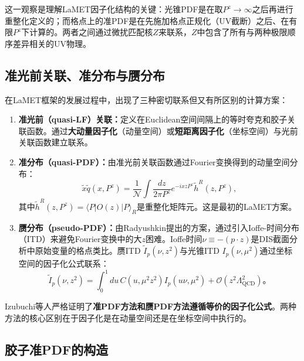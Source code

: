 \documentclass[12pt,a4paper]{ctexart}
\theoremstyle{definition}
\begin{document}
这一观察是理解LaMET因子化结构的关键：光锥PDF是在取$P^z \to \infty$之后再进行重整化定义的；而格点上的准PDF是在先施加格点正规化（UV截断）之后、在有限$P^z$下计算的。两者之间通过微扰匹配核$Z$来联系，$Z$中包含了所有与两种极限顺序差异相关的UV物理。

\subsection{准光前关联、准分布与赝分布}

在LaMET框架的发展过程中，出现了三种密切联系但又有所区别的计算方案\cite{Yao2023}：

\begin{enumerate}
    \item \textbf{准光前（quasi-LF）关联：}定义在Euclidean空间间隔上的等时夸克和胶子关联函数。通过\textbf{大动量因子化}（动量空间）或\textbf{短距离因子化}（坐标空间）与光前关联函数建立联系\cite{Yao2023}。

    \item \textbf{准分布（quasi-PDF）：}由准光前关联函数通过Fourier变换得到的动量空间分布：
    \begin{equation}
    \tilde{x}\tilde{q}(x, P^z) = \frac{1}{\mathcal{N}} \int \frac{dz}{2\pi P^z} e^{-ixzP^z} \tilde{h}^R(z, P^z),
    \label{eq:quasi_pdf_fourier}
    \end{equation}
    其中$\tilde{h}^R(z, P^z) = \langle P|O(z)|P\rangle_R$是重整化矩阵元。这是最初的LaMET方案\cite{Ji2013Euclidean}。

    \item \textbf{赝分布（pseudo-PDF）：}由Radyushkin提出的方案，通过引入Ioffe-时间分布（ITD）来避免Fourier变换中的大$z$困难\cite{Izubuchi2018}。Ioffe时间$\nu \equiv -(p \cdot z)$是DIS截面分析中原始变量的格点类比。赝ITD $\tilde{I}_p(\nu, z^2)$与光锥ITD $I_p(\nu, \mu^2)$通过坐标空间的因子化公式联系：
    \begin{equation}
    \tilde{I}_p(\nu, z^2) = \int_0^1 du\, C(u, \mu^2 z^2) I_p(u\nu, \mu^2) + \mathcal{O}(z^2\Lambda_{\text{QCD}}^2)。
    \label{eq:pseudo_factorization}
    \end{equation}
\end{enumerate}

Izubuchi等人\cite{Izubuchi2018}严格证明了\textbf{准PDF方法和赝PDF方法遵循等价的因子化公式}。两种方法的核心区别在于因子化是在动量空间还是在坐标空间中执行的。

\subsection{胶子准PDF的构造}
\end{document}
